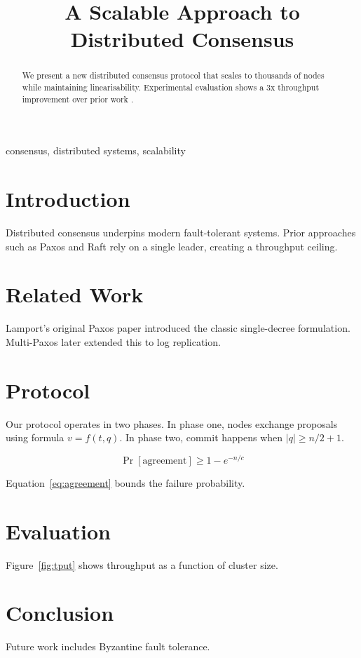 \documentclass[conference]{IEEEtran}
\begin{document}
\title{A Scalable Approach to Distributed Consensus}

\author{
}

\maketitle

\begin{abstract}
We present a new distributed consensus protocol that scales to thousands of nodes while maintaining linearisability. Experimental evaluation shows a 3x throughput improvement over prior work \cite{raft2014}.
\end{abstract}

\begin{IEEEkeywords}
consensus, distributed systems, scalability
\end{IEEEkeywords}

\section{Introduction}
Distributed consensus underpins modern fault-tolerant systems. Prior approaches such as Paxos \cite{paxos1998} and Raft \cite{raft2014} rely on a single leader, creating a throughput ceiling.

\section{Related Work}
Lamport's original Paxos paper \cite{paxos1998} introduced the classic single-decree formulation. Multi-Paxos \cite{paxos-live} later extended this to log replication.

\section{Protocol}
Our protocol operates in two phases. In phase one, nodes exchange proposals using formula $v = f(t, q)$. In phase two, commit happens when $|q| \geq n/2 + 1$.

\begin{equation}
\Pr[\text{agreement}] \geq 1 - e^{-n/c}
\label{eq:agreement}
\end{equation}

Equation~\eqref{eq:agreement} bounds the failure probability.

\section{Evaluation}
Figure~\ref{fig:tput} shows throughput as a function of cluster size.

\section{Conclusion}
Future work includes Byzantine fault tolerance.



\end{document}
